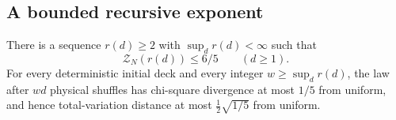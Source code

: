 \subsection{A bounded recursive exponent}
\begin{theorem}\label{tra:tilted-arrays:moment}
\label{tra:tilted-arrays:main-statement}
There is a sequence $r(d)\ge2$ with $\sup_d r(d)<\infty$ such that
\begin{equation}
\mathcal Z_N(r(d))\le 6/5
\qquad(d\ge1). \label{tra:tilted-arrays:eq1}
\end{equation}
For every deterministic initial deck and every integer $w\ge\sup_d r(d)$, the law after $wd$ physical shuffles has chi-square divergence at most $1/5$ from uniform, and hence total-variation distance at most $\frac12\sqrt{1/5}$ from uniform.
\end{theorem}
